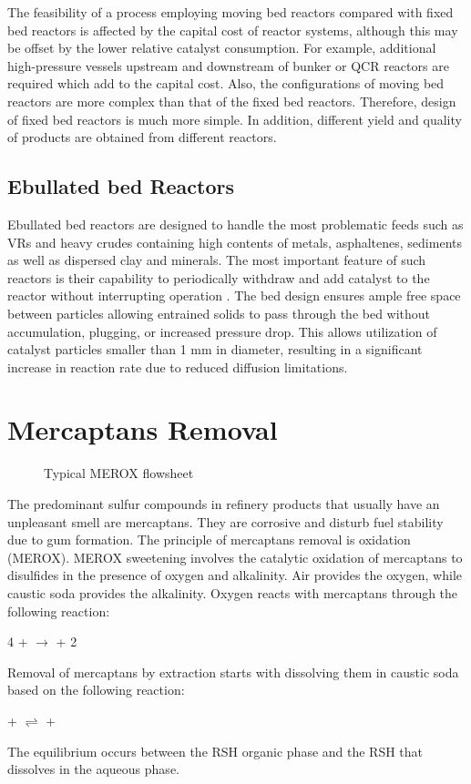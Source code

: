 The feasibility of a process employing moving bed reactors compared with fixed bed reactors is affected by the capital cost of reactor systems, although this may be offset by the lower relative catalyst consumption. For example, additional high-pressure vessels upstream and downstream of bunker or QCR reactors are required which add to the capital cost. Also, the configurations of moving bed reactors are more complex than that of the fixed bed reactors. Therefore, design of fixed bed reactors is much more simple. In addition, different yield and quality of products are obtained from different reactors.

\subsection{Ebullated bed Reactors}

Ebullated bed reactors are designed to handle the most problematic feeds such as VRs and heavy crudes containing high contents of metals, asphaltenes, sediments as well as dispersed clay and minerals. The most important feature of such reactors is their capability to periodically withdraw and add catalyst to the reactor without interrupting operation \citep{Furimsky1998177}. The bed design ensures ample free space between particles allowing entrained solids to pass through the bed without accumulation, plugging, or increased pressure drop. This allows utilization of catalyst particles smaller than 1 mm in diameter, resulting in a significant increase in reaction rate due to reduced diffusion limitations.


\section{Mercaptans Removal}
\begin{figure}[htbp]
\centering
{}
\caption{Typical MEROX flowsheet \citep{Fahim2010377}}
\label{fig:merox}
\end{figure}
The predominant sulfur compounds in refinery products that usually have an unpleasant smell are mercaptans. They are corrosive and disturb fuel stability due to gum formation. The principle of mercaptans removal is oxidation (MEROX). MEROX sweetening involves the catalytic oxidation of mercaptans to disulfides in the presence of oxygen and alkalinity. Air provides the oxygen, while caustic soda provides the alkalinity. Oxygen reacts with mercaptans through the following reaction:
\begin{center}
4 +  $\longrightarrow$  + 2
\end{center}
Removal of mercaptans by extraction starts with dissolving them in caustic soda based on the following reaction:
\begin{center}
 +  $\rightleftharpoons$  + 
\end{center}
The equilibrium occurs between the RSH organic phase and the RSH that dissolves in the aqueous phase.

